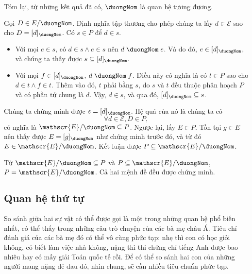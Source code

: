 Tóm lại, từ những kết quả đã có, $\duongNom$ là quan hệ tương đương. 

Gọi $D \in E/\duongNom$. Định nghĩa tập thương cho phép chúng ta lấy $d \in \mathscr{E}$ sao cho $D = [d]_{\duongNom}$. Có $s \in P$ để $d \in s$. 
\begin{itemize}
   \item Với mọi $e \in s$, có $d \in s \land e \in s$ nên $d\;\duongNom\;e$. Và do đó, $e \in [d]_{\duongNom}$, và chúng ta thấy được $s \subseteq [d]_{\duongNom}$.
   \item Với mọi $f \in [d]_{\duongNom}$, $d\;\duongNom\;f$. Điều này có nghĩa là có $t \in P$ sao cho $d \in t \land f \in t$. Thêm vào đó, $t$ phải bằng $s$, do $s$ và $t$ đều thuộc phân hoạch $P$ và có phần tử chung là $d$. Vậy, $d \in s$, và qua đó, $[d]_{\duongNom} \subseteq s$.
\end{itemize}
Chúng ta chứng minh được $s = [d]_{\duongNom}$. Hệ quả của nó là chúng ta có 
\begin{equation*}
   \forall d \in \mathscr{E}, D \in P,
\end{equation*}
có nghĩa là $\mathscr{E}/\duongNom \subseteq P$. Ngược lại, lấy $E \in P$. Tồn tại $g \in E$ nên thấy được $E = [g]_{\duongNom}$ như chứng minh trước đó, và từ đó $E \in \mathscr{E}/\duongNom$. Kết luận được $P \subseteq \mathscr{E}/\duongNom$.

Từ $\mathscr{E}/\duongNom \subseteq P$ và $P \subseteq \mathscr{E}/\duongNom$, $P = \mathscr{E}/\duongNom$. Cả hai mệnh đề đều được chứng minh.

\subsection{Quan hệ thứ tự}

So sánh giữa hai sự vật có thể được gọi là một trong những quan hệ phổ biến nhất, có thể thấy trong những câu trò chuyện của các bà mẹ châu Á. Tiêu chí đánh giá của các bà mẹ đó có thể vô cùng phức tạp: nhẹ thì con có học giỏi không, có biết làm việc nhà không, nặng thì thi chứng chỉ tiếng Anh được bao nhiêu hay có mấy giải Toán quốc tế rồi. Để có thể so sánh hai con của những người mang nặng đẻ đau đó, nhìn chung, sẽ cần nhiều tiêu chuẩn phức tạp. 

